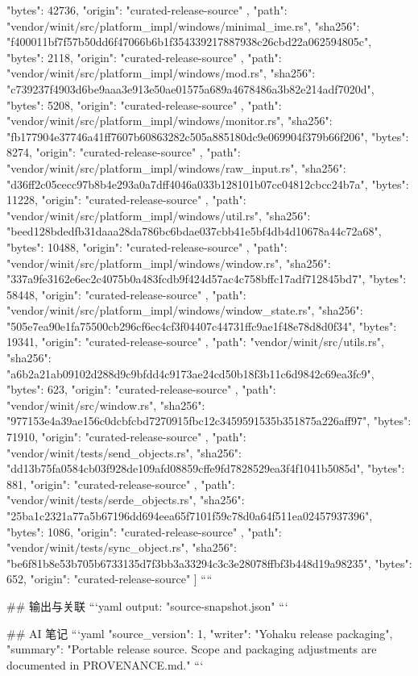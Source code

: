 {{      "bytes": 42736,
      "origin": "curated-release-source"
    },
    {
      "path": "vendor/winit/src/platform_impl/windows/minimal_ime.rs",
      "sha256": "f400011bf7f57b50dd6f47066b6b1f354339217887938c26cbd22a062594805c",
      "bytes": 2118,
      "origin": "curated-release-source"
    },
    {
      "path": "vendor/winit/src/platform_impl/windows/mod.rs",
      "sha256": "c739237f4903d6be9aaa3e913e50ae01575a689a4678486a3b82e214adf7020d",
      "bytes": 5208,
      "origin": "curated-release-source"
    },
    {
      "path": "vendor/winit/src/platform_impl/windows/monitor.rs",
      "sha256": "fb177904e37746a41ff7607b60863282c505a885180dc9e069904f379b66f206",
      "bytes": 8274,
      "origin": "curated-release-source"
    },
    {
      "path": "vendor/winit/src/platform_impl/windows/raw_input.rs",
      "sha256": "d36ff2c05cecc97b8b4e293a0a7dff4046a033b128101b07cc04812cbcc24b7a",
      "bytes": 11228,
      "origin": "curated-release-source"
    },
    {
      "path": "vendor/winit/src/platform_impl/windows/util.rs",
      "sha256": "beed128bdedfb31daaa28da786bc6bdae037cbb41e5bf4db4d10678a44c72a68",
      "bytes": 10488,
      "origin": "curated-release-source"
    },
    {
      "path": "vendor/winit/src/platform_impl/windows/window.rs",
      "sha256": "337a9fe3162e6ec2c4075b0a483fcdb9f424d57ac4c758bffc17adf712845bd7",
      "bytes": 58448,
      "origin": "curated-release-source"
    },
    {
      "path": "vendor/winit/src/platform_impl/windows/window_state.rs",
      "sha256": "505e7ea90e1fa75500cb296cf6ec4cf3f04407c44731ffc9ae1f48e78d8d0f34",
      "bytes": 19341,
      "origin": "curated-release-source"
    },
    {
      "path": "vendor/winit/src/utils.rs",
      "sha256": "a6b2a21ab09102d288d9c9bfdd4c9173ae24cd50b18f3b11c6d9842c69ea3fc9",
      "bytes": 623,
      "origin": "curated-release-source"
    },
    {
      "path": "vendor/winit/src/window.rs",
      "sha256": "977153e4a39ae156c0dcbfcbd7270915fbc12c3459591535b351875a226aff97",
      "bytes": 71910,
      "origin": "curated-release-source"
    },
    {
      "path": "vendor/winit/tests/send_objects.rs",
      "sha256": "dd13b75fa0584cb03f928de109afd08859cffe9fd7828529ea3f4f1041b5085d",
      "bytes": 881,
      "origin": "curated-release-source"
    },
    {
      "path": "vendor/winit/tests/serde_objects.rs",
      "sha256": "25ba1c2321a77a5b67196dd694eea65f7101f59c78d0a64f511ea02457937396",
      "bytes": 1086,
      "origin": "curated-release-source"
    },
    {
      "path": "vendor/winit/tests/sync_object.rs",
      "sha256": "be6f81b8e53b705b6733135d7f3bb3a33294c3c3e28078ffbf3b448d19a98235",
      "bytes": 652,
      "origin": "curated-release-source"
    }
  ]
}
````

## 输出与关联
```yaml
output: "source-snapshot.json"
```

## AI 笔记
```yaml
{"source_version": 1, "writer": "Yohaku release packaging", "summary": "Portable release source. Scope and packaging adjustments are documented in PROVENANCE.md."}
```

